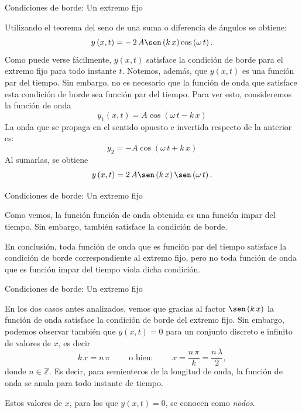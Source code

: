 \documentclass[11pt,handout,aspectratio=1610]{beamer}
\newcommand{\zz}{\mathbb{Z}}
\newcommand{\vs}{\vspace{11pt}}
\begin{document}
\begin{frame}{Condiciones de borde: Un extremo fijo}

    Utilizando el teorema del seno de una suma o diferencia de ángulos se obtiene: $$ y \left(x,t\right) = - \, 2 \, A \sen \left(k \, x\right) \cos \left(\omega \, t\right). $$ Como puede verse fácilmente, $y \left(x,t\right)$ satisface la condición de borde para el extremo fijo para todo instante $t$. Notemos, además, que $y \left(x,t\right) $ es una función par del tiempo. Sin embargo, no es necesario que la función de onda que satisface esta condición de borde sea función par del tiempo. Para ver esto, consideremos la función de onda $$ y_1 \left(x,t\right) = A \cos \left(\omega \, t - k \, x\right) $$ La onda que se propaga en el sentido opuesto e invertida respecto de la anterior es: $$ y_2 = - A \cos \left(\omega \, t + k \, x\right) $$ Al sumarlas, se obtiene $$ y \left(x,t\right) = 2 \, A \sen \left(k \, x\right) \sen \left(\omega \, t\right). $$

\end{frame}

\begin{frame}{Condiciones de borde: Un extremo fijo}

    Como vemos, la función función de onda obtenida es una función impar del tiempo. Sin embargo, también satisface la condición de borde. 
    
    \vs 
    
    En conclusión, toda función de onda que es función par del tiempo satisface la condición de borde correspondiente al extremo fijo, pero no toda función de onda que es función impar del tiempo viola dicha condición.

\end{frame}

\begin{frame}{Condiciones de borde: Un extremo fijo}

    En los dos casos antes analizados, vemos que gracias al factor $\sen \left(k \, x\right)$ la función de onda satisface la condición de borde del extremo fijo. Sin embargo, podemos observar también que $y \left(x,t\right) = 0 $ para un conjunto discreto e infinito de valores de $x$, es decir $$ k \, x = n \, \pi \qquad \text{ o bien: } \qquad x = \frac{n \, \pi}{k} = \frac{n \, \lambda}{2},$$ donde $n \in \zz $. Es decir, para semienteros de la longitud de onda, la función de onda se anula para todo instante de tiempo.

    \vs

    Estos valores de $x$, para los que $ y \left(x,t\right) = 0$, se conocen como \emph{nodos}. 

\end{frame}
\end{document}
